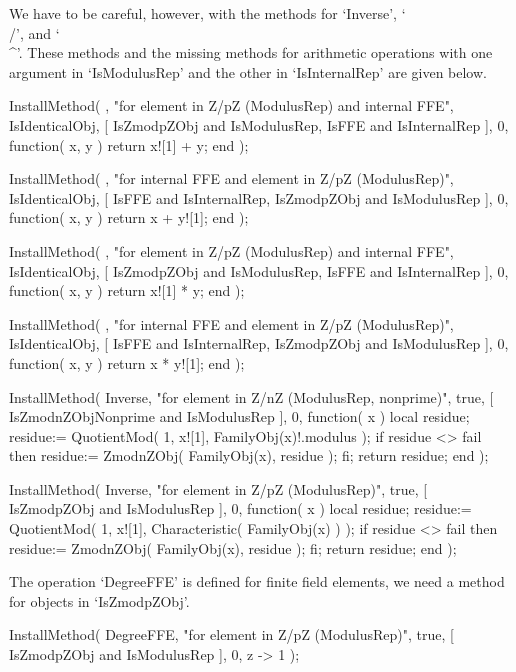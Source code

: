We have to be careful, however, with the methods for `Inverse', `\\/',
and `\\^'.
These methods and the missing methods for arithmetic operations with
one argument in `IsModulusRep' and the other in `IsInternalRep'
are given below.

\begintt
    InstallMethod( \+,
        "for element in Z/pZ (ModulusRep) and internal FFE",
        IsIdenticalObj,
        [ IsZmodpZObj and IsModulusRep, IsFFE and IsInternalRep ], 0,
        function( x, y ) return x![1] + y; end );

    InstallMethod( \+,
        "for internal FFE and element in Z/pZ (ModulusRep)",
        IsIdenticalObj,
        [ IsFFE and IsInternalRep, IsZmodpZObj and IsModulusRep ], 0,
        function( x, y ) return x + y![1]; end );

    InstallMethod( \*,
        "for element in Z/pZ (ModulusRep) and internal FFE",
        IsIdenticalObj,
        [ IsZmodpZObj and IsModulusRep, IsFFE and IsInternalRep ], 0,
        function( x, y ) return x![1] * y; end );

    InstallMethod( \*,
        "for internal FFE and element in Z/pZ (ModulusRep)",
        IsIdenticalObj,
        [ IsFFE and IsInternalRep, IsZmodpZObj and IsModulusRep ], 0,
        function( x, y ) return x * y![1]; end );

    InstallMethod( Inverse,
        "for element in Z/nZ (ModulusRep, nonprime)",
        true,
        [ IsZmodnZObjNonprime and IsModulusRep ], 0,
        function( x )
        local residue;
        residue:= QuotientMod( 1, x![1], FamilyObj(x)!.modulus );
        if residue <> fail then
          residue:= ZmodnZObj( FamilyObj(x), residue );
        fi;
        return residue;
        end );

    InstallMethod( Inverse,
        "for element in Z/pZ (ModulusRep)",
        true,
        [ IsZmodpZObj and IsModulusRep ], 0,
        function( x )
        local residue;
        residue:= QuotientMod( 1, x![1], Characteristic( FamilyObj(x) ) );
        if residue <> fail then
          residue:= ZmodnZObj( FamilyObj(x), residue );
        fi;
        return residue;
        end );
\endtt

The operation `DegreeFFE' is defined for finite field elements,
we need a method for objects in `IsZmodpZObj'.

\begintt
    InstallMethod( DegreeFFE,
        "for element in Z/pZ (ModulusRep)",
        true,
        [ IsZmodpZObj and IsModulusRep ], 0,
        z -> 1 );
\endtt

